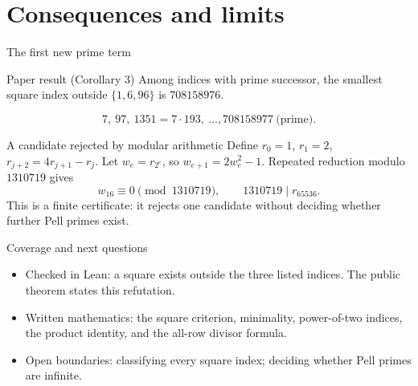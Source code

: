 \documentclass{beamer}
\begin{document}
\section[Scope]{Consequences and limits}
\begin{frame}{The first new prime term}
  \begin{block}{Paper result (Corollary 3)}
    Among indices with prime successor, the smallest square index outside $\{1,6,96\}$ is $708158976$.
  \end{block}
  \[
  7,\ 97,\ 1351=7\cdot193,\ \ldots, 708158977\ \text{(prime)}.
  \]
\end{frame}
\begin{frame}{A candidate rejected by modular arithmetic}
  Define $r_0=1$, $r_1=2$, $r_{j+2}=4r_{j+1}-r_j$.
  Let $w_e=r_{2^e}$, so $w_{e+1}=2w_e^2-1$. Repeated reduction modulo $1310719$ gives
  \[
  w_{16}\equiv0\pmod{1310719},\qquad 1310719\mid r_{65536}.
  \]
  This is a finite certificate: it rejects one candidate without deciding whether further Pell primes exist.
\end{frame}
\begin{frame}{Coverage and next questions}
  \begin{itemize}
    \item Checked in Lean: a square exists outside the three listed indices. The public theorem states this refutation.
    \item Written mathematics: the square criterion, minimality, power-of-two indices, the product identity, and the all-row divisor formula.
    \item Open boundaries: classifying every square index; deciding whether Pell primes are infinite.
  \end{itemize}
\end{frame}
\appendix
\FormalVerification
\end{document}
